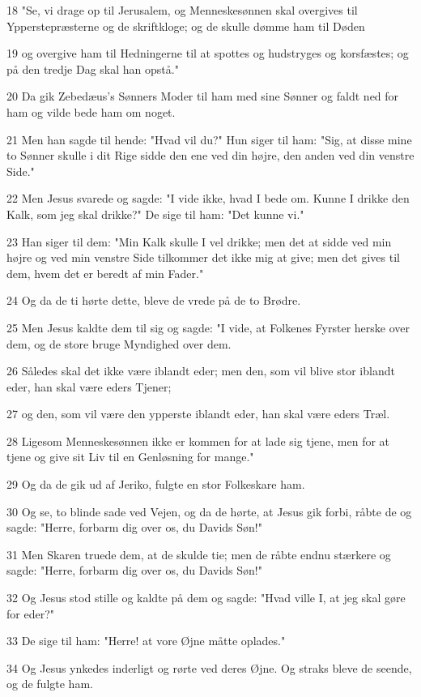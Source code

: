 \par 18 "Se, vi drage op til Jerusalem, og Menneskesønnen skal overgives til Ypperstepræsterne og de skriftkloge; og de skulle dømme ham til Døden
\par 19 og overgive ham til Hedningerne til at spottes og hudstryges og korsfæstes; og på den tredje Dag skal han opstå."
\par 20 Da gik Zebedæus's Sønners Moder til ham med sine Sønner og faldt ned for ham og vilde bede ham om noget.
\par 21 Men han sagde til hende: "Hvad vil du?" Hun siger til ham: "Sig, at disse mine to Sønner skulle i dit Rige sidde den ene ved din højre, den anden ved din venstre Side."
\par 22 Men Jesus svarede og sagde: "I vide ikke, hvad I bede om. Kunne I drikke den Kalk, som jeg skal drikke?" De sige til ham: "Det kunne vi."
\par 23 Han siger til dem: "Min Kalk skulle I vel drikke; men det at sidde ved min højre og ved min venstre Side tilkommer det ikke mig at give; men det gives til dem, hvem det er beredt af min Fader."
\par 24 Og da de ti hørte dette, bleve de vrede på de to Brødre.
\par 25 Men Jesus kaldte dem til sig og sagde: "I vide, at Folkenes Fyrster herske over dem, og de store bruge Myndighed over dem.
\par 26 Således skal det ikke være iblandt eder; men den, som vil blive stor iblandt eder, han skal være eders Tjener;
\par 27 og den, som vil være den ypperste iblandt eder, han skal være eders Træl.
\par 28 Ligesom Menneskesønnen ikke er kommen for at lade sig tjene, men for at tjene og give sit Liv til en Genløsning for mange."
\par 29 Og da de gik ud af Jeriko, fulgte en stor Folkeskare ham.
\par 30 Og se, to blinde sade ved Vejen, og da de hørte, at Jesus gik forbi, råbte de og sagde: "Herre, forbarm dig over os, du Davids Søn!"
\par 31 Men Skaren truede dem, at de skulde tie; men de råbte endnu stærkere og sagde: "Herre, forbarm dig over os, du Davids Søn!"
\par 32 Og Jesus stod stille og kaldte på dem og sagde: "Hvad ville I, at jeg skal gøre for eder?"
\par 33 De sige til ham: "Herre! at vore Øjne måtte oplades."
\par 34 Og Jesus ynkedes inderligt og rørte ved deres Øjne. Og straks bleve de seende, og de fulgte ham.

